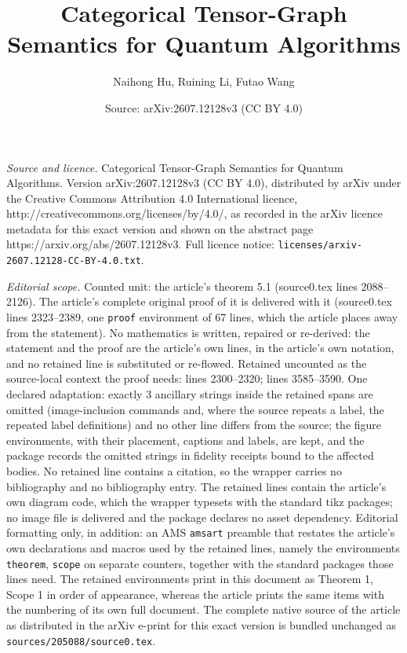 \documentclass[10pt,a4paper]{amsart}
\title{Categorical Tensor-Graph Semantics for Quantum Algorithms}
\author{Naihong Hu, Ruining Li, Futao Wang}
\date{Source: arXiv:2607.12128v3 (CC BY 4.0)}
\begin{document}
\maketitle

\noindent\emph{Source and licence.} Categorical Tensor-Graph Semantics for Quantum Algorithms. Version arXiv:2607.12128v3 (CC BY 4.0), distributed by arXiv under the Creative Commons Attribution 4.0 International licence, http://creativecommons.org/licenses/by/4.0/, as recorded in the arXiv licence metadata for this exact version and shown on the abstract page https://arxiv.org/abs/2607.12128v3. Full licence notice: \texttt{licenses/arxiv-2607.12128-CC-BY-4.0.txt}.\par\smallskip

\noindent\textit{Editorial scope.} Counted unit: the article's theorem 5.1 (source0.tex lines 2088--2126). The article's complete original proof of it is delivered with it (source0.tex lines 2323--2389, one \texttt{proof} environment of 67 lines, which the article places away from the statement). No mathematics is written, repaired or re-derived: the statement and the proof are the article's own lines, in the article's own notation, and no retained line is substituted or re-flowed.  Retained uncounted as the source-local context the proof needs: lines 2300--2320; lines 3585--3590.  One declared adaptation: exactly 3 ancillary strings inside the retained spans are omitted (image-inclusion commands and, where the source repeats a label, the repeated label definitions) and no other line differs from the source; the figure environments, with their placement, captions and labels, are kept, and the package records the omitted strings in fidelity receipts bound to the affected bodies.  No retained line contains a citation, so the wrapper carries no bibliography and no bibliography entry.  The retained lines contain the article's own diagram code, which the wrapper typesets with the standard tikz packages; no image file is delivered and the package declares no asset dependency.  Editorial formatting only, in addition: an AMS \texttt{amsart} preamble that restates the article's own declarations and macros used by the retained lines, namely the environments \texttt{theorem}, \texttt{scope} on separate counters, together with the standard packages those lines need.  The retained environments print in this document as Theorem 1, Scope 1 in order of appearance, whereas the article prints the same items with the numbering of its own full document.  The complete native source of the article as distributed in the arXiv e-print for this exact version is bundled unchanged as \texttt{sources/205088/source0.tex}.
\end{document}
